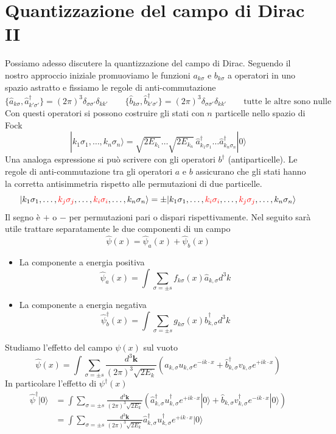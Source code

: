 \section{Quantizzazione del campo di Dirac II}
Possiamo adesso discutere la quantizzazione del campo di Dirac. Seguendo il nostro approccio iniziale promuoviamo le funzioni $a_{k\sigma}$ e $b_{k\sigma}$ a operatori in uno spazio astratto e fissiamo le regole di anti-commutazione
$$
\{\hat{a}_{k\sigma}, \hat{a}_{k'\sigma'}^\dagger\} = (2\pi)^3 \delta_{\sigma\sigma'}\delta_{kk'} \qquad \{\hat{b}_{k\sigma}, \hat{b}_{k'\sigma'}^\dagger\} = (2\pi)^3 \delta_{\sigma\sigma'}\delta_{kk'} \qquad \text{tutte le altre sono nulle}
$$
Con questi operatori si possono costruire gli stati con $n$ particelle nello spazio di Fock
$$
|k_1\sigma_1, \dots, k_n\sigma_n\rangle = \sqrt{2E_{k_1}}\dots\sqrt{2E_{k_n}} \, \hat{a}_{k_1\sigma_1}^\dagger \dots \hat{a}_{k_n\sigma_n}^\dagger |0\rangle
$$
Una analoga espressione si può scrivere con gli operatori $b^\dagger$ (antiparticelle). Le regole di anti-commutazione tra gli operatori $a$ e $b$ assicurano che gli stati hanno la corretta antisimmetria rispetto alle permutazioni di due particelle.
$$
|k_1\sigma_1, \dots, \textcolor{red}{k_j\sigma_j}, \dots,\textcolor{red}{k_i\sigma_i}, \dots, k_n\sigma_n\rangle = \pm |k_1\sigma_1, \dots, \textcolor{red}{k_i\sigma_i}, \dots, \textcolor{red}{k_j\sigma_j}, \dots, k_n\sigma_n\rangle
$$
Il segno è $+$ o $-$ per permutazioni pari o dispari rispettivamente. Nel seguito sarà utile trattare separatamente le due componenti di un campo
$$
\hat{\psi}(x) = \hat{\psi}_a(x) + \hat{\psi}_b(x)
$$
\begin{itemize}
    \item La componente a energia positiva
    $$
\hat{\psi}_a(x) = \int \sum_{\sigma=\pm s} f_{k\sigma}(x) \hat{a}_{k,\sigma} d^3k
$$
\item La componente a energia negativa
$$
\hat{\psi}_b^\dagger(x) = \int \sum_{\sigma=\pm s} g_{k\sigma}(x) \hat{b}_{k,\sigma}^\dagger d^3k
$$
\end{itemize}
Studiamo l'effetto del campo $\psi(x)$ sul vuoto
$$
\hat{\psi}(x) = \int \sum_{\sigma=\pm s} \frac{d^3\mathbf{k}}{(2\pi)^3\sqrt{2E_k}} \left( \hat{a}_{k,\sigma} u_{k,\sigma} e^{-ik\cdot x} + \hat{b}_{k,\sigma}^\dagger v_{k,\sigma} e^{+ik\cdot x} \right)
$$
In particolare l'effetto di $\psi^\dagger(x)$
\begin{align*}
\hat{\psi}^\dagger |0\rangle &= \int \sum_{\sigma=\pm s} \frac{d^3\mathbf{k}}{(2\pi)^3\sqrt{2E_k}} \left( \hat{a}_{k,\sigma}^\dagger u_{k,\sigma}^\dagger e^{+ik\cdot x} |0\rangle + \hat{b}_{k,\sigma} v_{k,\sigma}^\dagger e^{-ik\cdot x} |0\rangle \right) \\
&= \int \sum_{\sigma=\pm s} \frac{d^3\mathbf{k}}{(2\pi)^3\sqrt{2E_k}} \hat{a}_{k,\sigma}^\dagger u_{k,\sigma}^\dagger e^{+ik\cdot x} |0\rangle
\end{align*}

